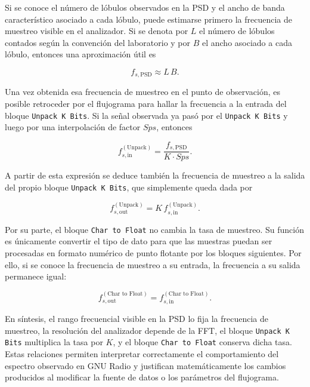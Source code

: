Si se conoce el número de lóbulos observados en la PSD y el ancho de banda característico asociado a cada lóbulo, puede estimarse primero la frecuencia de muestreo visible en el analizador. Si se denota por \(L\) el número de lóbulos contados según la convención del laboratorio y por \(B\) el ancho asociado a cada lóbulo, entonces una aproximación útil es

\[
f_{s,\text{PSD}} \approx L \, B.
\]

Una vez obtenida esa frecuencia de muestreo en el punto de observación, es posible retroceder por el flujograma para hallar la frecuencia a la entrada del bloque \texttt{Unpack K Bits}. Si la señal observada ya pasó por el \texttt{Unpack K Bits} y luego por una interpolación de factor \(Sps\), entonces

\[
f_{s,\text{in}}^{(\text{Unpack})}
=
\frac{f_{s,\text{PSD}}}{K \cdot Sps}.
\]

A partir de esta expresión se deduce también la frecuencia de muestreo a la salida del propio bloque \texttt{Unpack K Bits}, que simplemente queda dada por

\[
f_{s,\text{out}}^{(\text{Unpack})}
=
K\,f_{s,\text{in}}^{(\text{Unpack})}.
\]

Por su parte, el bloque \texttt{Char to Float} no cambia la tasa de muestreo. Su función es únicamente convertir el tipo de dato para que las muestras puedan ser procesadas en formato numérico de punto flotante por los bloques siguientes. Por ello, si se conoce la frecuencia de muestreo a su entrada, la frecuencia a su salida permanece igual:

\[
f_{s,\text{out}}^{(\text{Char to Float})}
=
f_{s,\text{in}}^{(\text{Char to Float})}.
\]

En síntesis, el rango frecuencial visible en la PSD lo fija la frecuencia de muestreo, la resolución del analizador depende de la FFT, el bloque \texttt{Unpack K Bits} multiplica la tasa por \(K\), y el bloque \texttt{Char to Float} conserva dicha tasa. Estas relaciones permiten interpretar correctamente el comportamiento del espectro observado en GNU Radio y justifican matemáticamente los cambios producidos al modificar la fuente de datos o los parámetros del flujograma.
